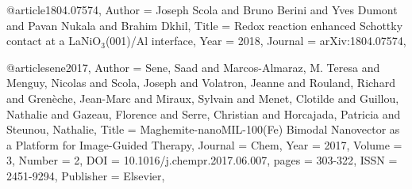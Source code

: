 @article{1804.07574,
Author = {Joseph Scola and Bruno Berini and Yves Dumont and Pavan Nukala and Brahim Dkhil},
Title = {Redox reaction enhanced Schottky contact at a LaNiO$_3$(001)/Al interface},
Year = {2018},
Journal = {arXiv:1804.07574},
}

@article{sene2017,
Author = {Sene, Saad and Marcos-Almaraz, M. Teresa and Menguy, Nicolas and
	Scola, Joseph and Volatron, Jeanne and Rouland, Richard and Grenèche, Jean-Marc and
	Miraux, Sylvain and Menet, Clotilde and Guillou, Nathalie and Gazeau, Florence and
	Serre, Christian and Horcajada, Patricia and Steunou, Nathalie},
Title = {Maghemite-nanoMIL-100(Fe) Bimodal Nanovector as a Platform for Image-Guided Therapy},
Journal = {Chem},
Year = {2017},
Volume = {3},
Number = {2},
DOI = {10.1016/j.chempr.2017.06.007},
pages = {303-322},	
ISSN = {2451-9294},
Publisher = {Elsevier},
}
  	
